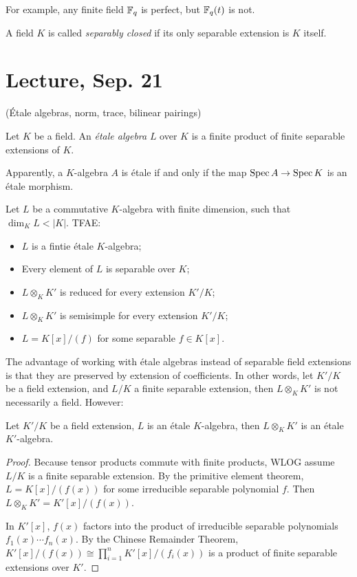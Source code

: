 \documentclass[11pt]{amsart}
\begin{document}
For example, any finite field $\mathbb{F}_q$ is perfect, but $\mathbb{F}_q(t)$ is not.

\begin{defn}
A field $K$ is called \emph{separably closed} if its only separable extension is $K$ itself.
\end{defn}

\section{Lecture, Sep. 21}

(\'Etale algebras, norm, trace, bilinear pairings)

\begin{defn}
Let $K$ be a field. An \emph{\'etale algebra} $L$ over $K$ is a finite product of finite separable extensions of $K$.
\end{defn}

Apparently, a $K$-algebra $A$ is \'etale if and only if the map $\operatorname{Spec} A\to \operatorname{Spec} K$ is an \'etale morphism.

\begin{prop}
Let $L$ be a commutative $K$-algebra with finite dimension, such that $\dim_K L < |K|$. TFAE:
\begin{itemize}
    \item $L$ is a fintie \'etale $K$-algebra;
    \item Every element of $L$ is separable over $K$;
    \item $L\otimes_K K'$ is reduced for every extension $K'/K$;
    \item $L\otimes_K K'$ is semisimple for every extension $K'/K$;
    \item $L = K[x]/(f)$ for some separable $f\in K[x]$.
\end{itemize}
\end{prop}

The advantage of working with \'etale algebras instead of separable field extensions is that they are preserved by extension of coefficients. In other words, let $K'/K$ be a field extension, and $L/K$ a finite separable extension, then $L\otimes_K K'$ is not necessarily a field. However:

\begin{prop}
Let $K'/K$ be a field extension, $L$ is an \'etale $K$-algebra, then $L\otimes_K K'$ is an \'etale $K'$-algebra.
\end{prop}

\begin{proof}
Because tensor products commute with finite products, WLOG assume $L/K$ is a finite separable extension. By the primitive element theorem, $L = K[x]/(f(x))$ for some irreducible separable polynomial $f$. Then $L\otimes_K K' = K'[x]/(f(x))$. 

In $K'[x]$, $f(x)$ factors into the product of irreducible separable polynomials $f_1(x)\cdots f_n(x)$. By the Chinese Remainder Theorem, $K'[x]/(f(x)) \cong \prod_{i = 1}^n K'[x]/(f_i(x))$ is a product of finite separable extensions over $K'$.
\end{proof}
\end{document}
